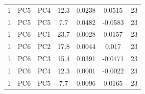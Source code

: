\begin{table}[htbp]
\begin{tabular}{lcccccc}
        1 & PC5 & PC4 & 12.3 & 0.0238 & 0.0515 & 23 \\
        1 & PC5 & PC5 & 7.7 & 0.0482 & -0.0583 & 23 \\
        1 & PC6 & PC1 & 23.7 & 0.0028 & 0.0157 & 23 \\
        1 & PC6 & PC2 & 17.8 & 0.0044 & 0.017 & 23 \\
        1 & PC6 & PC3 & 15.4 & 0.0391 & -0.0471 & 23 \\
        1 & PC6 & PC4 & 12.3 & 0.0001 & -0.0022 & 23 \\
        1 & PC6 & PC5 & 7.7 & 0.0096 & 0.0165 & 23 \\
        \bottomrule
    \end{tabular}
\end{table}

